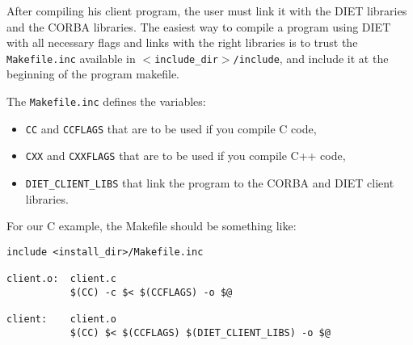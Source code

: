 After compiling his client program, the user must link it with the DIET
libraries and the CORBA libraries. The easiest way to compile a program using
DIET with all necessary flags and links with the right libraries is to trust the
\texttt{Makefile.inc} available in \texttt{$<$include\_dir$>$/include}, and
include it at the beginning of the program makefile.

The \texttt{Makefile.inc} defines the variables:
\begin{itemize}
\item \texttt{CC} and \texttt{CCFLAGS} that are to be used if you compile C
 code,
\item \texttt{CXX} and \texttt{CXXFLAGS} that are to be used if you compile C++
  code,
\item \texttt{DIET\_CLIENT\_LIBS} that link the program to the CORBA and DIET
  client libraries.
\end{itemize}

For our C example, the Makefile should be something like:
{\footnotesize
\begin{verbatim}
include <install_dir>/Makefile.inc

client.o:  client.c
           $(CC) -c $< $(CCFLAGS) -o $@

client:    client.o
           $(CC) $< $(CCFLAGS) $(DIET_CLIENT_LIBS) -o $@
\end{verbatim}
}

